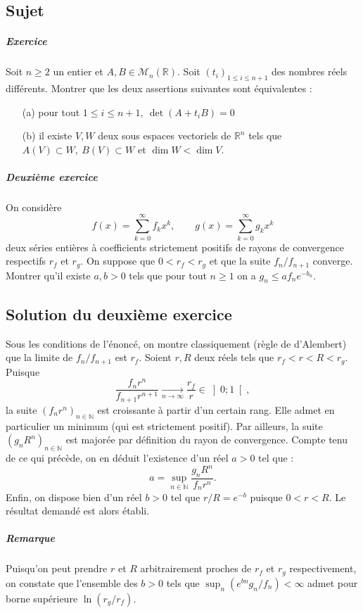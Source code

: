 \chapter{}

\section{Sujet}

\paragraph{Exercice}
Soit $n \geqslant 2$ un entier et $A,B \in \mathscr M_n(\mathbb R)$. Soit $(t_i)_{1\leqslant i \leqslant n+1}$ des nombres réels différents. Montrer que les deux assertions suivantes sont équivalentes :
\begin{enumerate}
    \item[(a)] pour tout $1 \leqslant i \leqslant n+1,\ \det(A+t_iB) = 0$
    \item[(b)] il existe $V,W$ deux sous espaces vectoriels de $\mathbb R^n$ tels que $A(V) \subset W,\ B(V) \subset W$ et $\dim W < \dim V$.
\end{enumerate}
\paragraph{Deuxième exercice}
On considère
$$
f(x) = \sum_{k=0}^{\infty} f_k x^k,
\qquad
g(x) = \sum_{k=0}^{\infty} g_k x^k
$$
deux séries entières à coefficients strictement positifs de rayons de convergence respectifs $r_f$ et $r_g$.
On suppose que $0 < r_f < r_g$ et que la suite $f_n/f_{n+1}$ converge.
Montrer qu'il existe $a,b > 0$ tels que pour tout $n \geqslant 1$ on a $g_n \leqslant a f_n e^{-b_n}$.

\section{Solution du deuxième exercice}

Sous les conditions de l'énoncé, on montre classiquement (règle de d'Alembert) que la limite de $f_n/f_{n+1}$ est $r_f$.
Soient $r,R$ deux réels tels que $r_f < r < R < r_g$. Puisque
$$
\frac{f_n r^n}{f_{n+1}r^{n+1}} \xrightarrow[n\to\infty]{} \frac{r_f}{r} \in \left]0;1\right[,
$$
la suite $(f_n r^n)_{n\in\mathbb N}$ est croissante à partir d'un certain rang. Elle admet en particulier un minimum (qui est strictement positif).
Par ailleurs, la suite $(g_n R^n)_{n\in\mathbb N}$ est majorée par définition du rayon de convergence. Compte tenu de ce qui précède, on en déduit l'existence d'un réel $a > 0$ tel que :
$$
a = \sup_{n\in\mathbb N} \frac{g_n R^n}{f_n r^n}.
$$
Enfin, on dispose bien d'un réel $b > 0$ tel que $r/R = e^{-b}$ puisque $0 < r < R$.
Le résultat demandé est alors établi.

\paragraph{Remarque}
Puisqu'on peut prendre $r$ et $R$ arbitrairement proches de $r_f$ et $r_g$ respectivement, on constate que l'ensemble des $b > 0$ tels que $\sup_n (e^{bn} g_n/f_n) < \infty$ admet pour borne supérieure $\ln(r_g/r_f)$.
